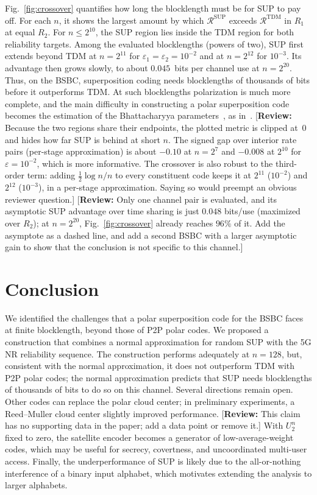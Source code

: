 \documentclass[conference]{IEEEtran}
\newcommand{\Rs}{\mathcal{R}}
\newcommand{\reviewnote}[1]{{\color{red}\footnotesize[\textbf{Review:} #1]}}
\begin{document}
Fig.~\ref{fig:crossover} quantifies how long the blocklength must be for SUP to pay off. For each $n$, it shows the largest amount by which $\Rs^{\mathrm{SUP}}$ exceeds $\Rs^{\mathrm{TDM}}$ in $R_1$ at equal $R_2$. For $n\leq2^{10}$, the SUP region lies inside the TDM region for both reliability targets. Among the evaluated blocklengths (powers of two), SUP first extends beyond TDM at $n=2^{11}$ for $\varepsilon_1=\varepsilon_2=10^{-2}$ and at $n=2^{12}$ for $10^{-3}$. Its advantage then grows slowly, to about $0.045$~bits per channel use at $n=2^{20}$. Thus, on the BSBC, superposition coding needs blocklengths of thousands of bits before it outperforms TDM. At such blocklengths polarization is much more complete, and the main difficulty in constructing a polar superposition code becomes the estimation of the Bhattacharyya parameters~\cite{talvardy2013}, as in~\cite{CHOI2017111}. \reviewnote{Because the two regions share their endpoints, the plotted metric is clipped at~0 and hides how far SUP is behind at short $n$. The signed gap over interior rate pairs (per-stage approximation) is about $-0.10$ at $n=2^7$ and $-0.008$ at $2^{10}$ for $\varepsilon=10^{-2}$, which is more informative. The crossover is also robust to the third-order term: adding $\frac{1}{2}\log n/n$ to every constituent code keeps it at $2^{11}$ ($10^{-2}$) and $2^{12}$ ($10^{-3}$), in a per-stage approximation. Saying so would preempt an obvious reviewer question.} \reviewnote{Only one channel pair is evaluated, and its asymptotic SUP advantage over time sharing is just $0.048$ bits/use (maximized over $R_2$); at $n=2^{20}$, Fig.~\ref{fig:crossover} already reaches $96\%$ of it. Add the asymptote as a dashed line, and add a second BSBC with a larger asymptotic gain to show that the conclusion is not specific to this channel.}

\section{Conclusion}
\label{sec:conclusion}
We identified the challenges that a polar superposition code for the BSBC faces at finite blocklength, beyond those of P2P polar codes. We proposed a construction that combines a normal approximation for random SUP with the 5G NR reliability sequence. The construction performs adequately at $n=128$, but, consistent with the normal approximation, it does not outperform TDM with P2P polar codes; the normal approximation predicts that SUP needs blocklengths of thousands of bits to do so on this channel. Several directions remain open. Other codes can replace the polar cloud center; in preliminary experiments, a Reed--Muller cloud center slightly improved performance. \reviewnote{This claim has no supporting data in the paper; add a data point or remove it.} With $U_2^n$ fixed to zero, the satellite encoder becomes a generator of low-average-weight codes, which may be useful for secrecy, covertness, and uncoordinated multi-user access. Finally, the underperformance of SUP is likely due to the all-or-nothing interference of a binary input alphabet, which motivates extending the analysis to larger alphabets.



\end{document}
